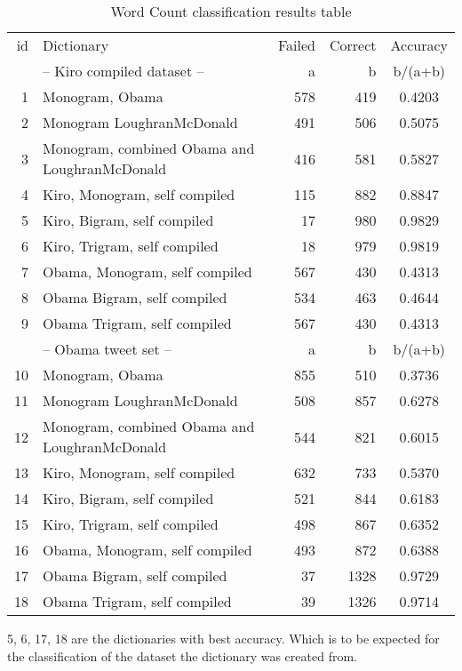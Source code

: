 \begin{table}
\centering
\label{tbl:sentiment_word_count_results}
\caption{Word Count classification results table}
\begin{tabular}{ r p{6cm} r r c }
id & Dictionary & Failed & Correct & Accuracy \\
& -- Kiro compiled dataset -- & a & b & b/(a+b) \\
\hline
1 & Monogram, Obama & 578 & 419 & 0.4203 \\
2 & Monogram LoughranMcDonald & 491 & 506 & 0.5075 \\
3 & Monogram, combined Obama and LoughranMcDonald & 416 & 581 & 0.5827 \\
4 & Kiro, Monogram, self compiled & 115 & 882 & 0.8847 \\
5 & Kiro, Bigram, self compiled & 17 & 980 & 0.9829 \\
6 & Kiro, Trigram, self compiled & 18 & 979 & 0.9819 \\
7 & Obama, Monogram, self compiled & 567 & 430 & 0.4313 \\
8 & Obama Bigram, self compiled & 534 & 463 & 0.4644 \\
9 & Obama Trigram, self compiled & 567 & 430 & 0.4313 \\
& -- Obama tweet set -- & a & b & b/(a+b) \\
\hline
10 & Monogram, Obama & 855 & 510 & 0.3736 \\
11 & Monogram LoughranMcDonald & 508 & 857 & 0.6278 \\
12 & Monogram, combined Obama and LoughranMcDonald & 544 & 821 & 0.6015 \\
13 & Kiro, Monogram, self compiled & 632 & 733 & 0.5370 \\
14 & Kiro, Bigram, self compiled & 521 & 844 & 0.6183 \\
15 & Kiro, Trigram, self compiled & 498 & 867 & 0.6352 \\
16 & Obama, Monogram, self compiled & 493 & 872 & 0.6388 \\
17 & Obama Bigram, self compiled & 37 & 1328 & 0.9729 \\
18 & Obama Trigram, self compiled & 39 & 1326 & 0.9714 \\
\end{tabular}
\end{table}

5, 6, 17, 18 are the dictionaries with best accuracy. Which is to be expected
for the classification of the dataset the dictionary was created from.

